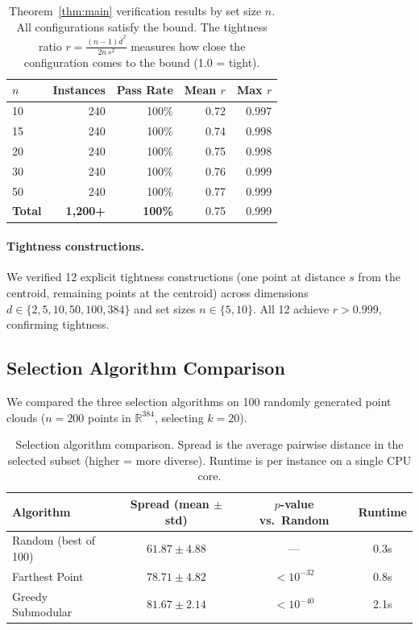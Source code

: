 \documentclass[11pt,a4paper]{article}
\newcommand{\R}{\mathbb{R}}
\begin{document}
\begin{table}[t]
\centering
\caption{Theorem~\ref{thm:main} verification results by
set size $n$.  All configurations satisfy the bound.
The tightness ratio
$r = \frac{(n-1)\bar{d}^2}{2n\,s^2}$
measures how close the configuration comes to the bound
(1.0 = tight).}
\label{tab:theorem_verify}
\begin{tabular}{@{}lrrrr@{}}
\toprule
$n$ & Instances & Pass Rate & Mean $r$ & Max $r$ \\
\midrule
10  & 240 & 100\% & 0.72 & 0.997 \\
15  & 240 & 100\% & 0.74 & 0.998 \\
20  & 240 & 100\% & 0.75 & 0.998 \\
30  & 240 & 100\% & 0.76 & 0.999 \\
50  & 240 & 100\% & 0.77 & 0.999 \\
\midrule
\textbf{Total} & \textbf{1{,}200+} & \textbf{100\%}
& 0.75 & 0.999 \\
\bottomrule
\end{tabular}
\end{table}

\paragraph{Tightness constructions.}
We verified 12 explicit tightness constructions
(one point at distance $s$ from the centroid, remaining
points at the centroid) across dimensions $d \in \{2,
5, 10, 50, 100, 384\}$ and set sizes
$n \in \{5, 10\}$.  All 12 achieve
$r > 0.999$, confirming tightness.

\subsection{Selection Algorithm Comparison}\label{sec:exp_selection}

We compared the three selection algorithms on 100
randomly generated point clouds ($n = 200$ points in
$\R^{384}$, selecting $k = 20$).

\begin{table}[t]
\centering
\caption{Selection algorithm comparison.  Spread is the
average pairwise distance in the selected subset
(higher = more diverse).  Runtime is per instance on
a single CPU core.}
\label{tab:selection}
\begin{tabular}{@{}lccc@{}}
\toprule
Algorithm & Spread (mean $\pm$ std) & $p$-value vs.\ Random
& Runtime \\
\midrule
Random (best of 100)
  & $61.87 \pm 4.88$ & --- & 0.3s \\
Farthest Point
  & $78.71 \pm 4.82$ & $< 10^{-32}$ & 0.8s \\
Greedy Submodular
  & $81.67 \pm 2.14$ & $< 10^{-40}$ & 2.1s \\
\bottomrule
\end{tabular}
\end{table}
\end{document}
